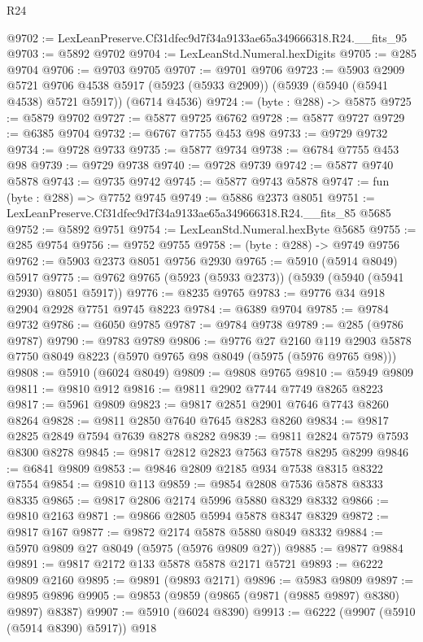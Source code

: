 \begin{lexlean}{R24}
\begin{coremodule}
@9702 := LexLeanPreserve.Cf31dfec9d7f34a9133ae65a349666318.R24.__fits_95
@9703 := @5892 @9702
@9704 := LexLeanStd.Numeral.hexDigits
@9705 := @285 @9704
@9706 := @9703 @9705
@9707 := @9701 @9706
@9723 := @5903
    @2909
    @5721
    @9706
    @4538
    @5917
    (@5923 (@5933 @2909))
    (@5939 (@5940 (@5941 @4538) @5721 @5917))
    (@6714 @4536)
@9724 := (byte : @288) -> @5875
@9725 := @5879 @9702
@9727 := @5877 @9725 @6762
@9728 := @5877 @9727
@9729 := @6385 @9704
@9732 := @6767 @7755 @453 @98
@9733 := @9729 @9732
@9734 := @9728 @9733
@9735 := @5877 @9734
@9738 := @6784 @7755 @453 @98
@9739 := @9729 @9738
@9740 := @9728 @9739
@9742 := @5877 @9740 @5878
@9743 := @9735 @9742
@9745 := @5877 @9743 @5878
@9747 := fun (byte : @288) => @7752 @9745
@9749 := @5886 @2373 @8051
@9751 := LexLeanPreserve.Cf31dfec9d7f34a9133ae65a349666318.R24.__fits_85 @5685
@9752 := @5892 @9751
@9754 := LexLeanStd.Numeral.hexByte @5685
@9755 := @285 @9754
@9756 := @9752 @9755
@9758 := (byte : @288) -> @9749 @9756
@9762 := @5903 @2373 @8051 @9756 @2930
@9765 := @5910 (@5914 @8049) @5917
@9775 := @9762 @9765 (@5923 (@5933 @2373)) (@5939 (@5940 (@5941 @2930) @8051 @5917))
@9776 := @8235 @9765
@9783 := @9776 @34 @918 @2904 @2928 @7751 @9745 @8223
@9784 := @6389 @9704
@9785 := @9784 @9732
@9786 := @6050 @9785
@9787 := @9784 @9738
@9789 := @285 (@9786 @9787)
@9790 := @9783 @9789
@9806 := @9776
    @27
    @2160
    @119
    @2903
    @5878
    @7750
    @8049
    @8223
    (@5970 @9765 @98 @8049 (@5975 (@5976 @9765 @98)))
@9808 := @5910 (@6024 @8049)
@9809 := @9808 @9765
@9810 := @5949 @9809
@9811 := @9810 @912
@9816 := @9811 @2902 @7744 @7749 @8265 @8223
@9817 := @5961 @9809
@9823 := @9817 @2851 @2901 @7646 @7743 @8260 @8264
@9828 := @9811 @2850 @7640 @7645 @8283 @8260
@9834 := @9817 @2825 @2849 @7594 @7639 @8278 @8282
@9839 := @9811 @2824 @7579 @7593 @8300 @8278
@9845 := @9817 @2812 @2823 @7563 @7578 @8295 @8299
@9846 := @6841 @9809
@9853 := @9846 @2809 @2185 @934 @7538 @8315 @8322 @7554
@9854 := @9810 @113
@9859 := @9854 @2808 @7536 @5878 @8333 @8335
@9865 := @9817 @2806 @2174 @5996 @5880 @8329 @8332
@9866 := @9810 @2163
@9871 := @9866 @2805 @5994 @5878 @8347 @8329
@9872 := @9817 @167
@9877 := @9872 @2174 @5878 @5880 @8049 @8332
@9884 := @5970 @9809 @27 @8049 (@5975 (@5976 @9809 @27))
@9885 := @9877 @9884
@9891 := @9817 @2172 @133 @5878 @5878 @2171 @5721
@9893 := @6222 @9809 @2160
@9895 := @9891 (@9893 @2171)
@9896 := @5983 @9809
@9897 := @9895 @9896
@9905 := @9853 (@9859 (@9865 (@9871 (@9885 @9897) @8380) @9897) @8387)
@9907 := @5910 (@6024 @8390)
@9913 := @6222 (@9907 (@5910 (@5914 @8390) @5917)) @918

\end{coremodule}
\end{lexlean}
